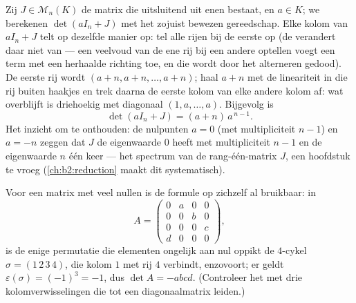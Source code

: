 \begin{example}\label{ex:b2:linalg:onesmatrix}
Zij $J \in \mathcal{M}_n(K)$ de matrix die uitsluitend uit enen
bestaat, en $a \in K$; we berekenen $\det(aI_n + J)$ met het zojuist
bewezen gereedschap. Elke kolom van $aI_n + J$ telt op dezelfde
manier op: tel alle rijen bij de eerste op (de 
verandert daar niet van --- een veelvoud van de ene rij bij een
andere optellen voegt een term met een herhaalde richting toe, en
die wordt door het alterneren gedood). De eerste rij wordt $(a +
n, a + n, \dots, a + n)$; haal $a + n$ met de lineariteit in die
rij buiten haakjes en trek daarna de eerste kolom van elke andere
kolom af: wat overblijft is driehoekig met diagonaal $(1, a,
\dots, a)$. Bijgevolg is
\[
\det(aI_n + J) = (a + n)\,a^{\,n-1}.
\]
Het inzicht om te onthouden: de nulpunten $a = 0$ (met
multipliciteit $n - 1$) en $a = -n$ zeggen dat $J$ de eigenwaarde
$0$ heeft met multipliciteit $n - 1$ en de eigenwaarde $n$ één
keer --- het spectrum van de rang-één-matrix $J$, een hoofdstuk te
vroeg (\cref{ch:b2:reduction} maakt dit systematisch).
\end{example}

\begin{example}\label{ex:b2:linalg:permexample}
Voor een matrix met veel nullen is de formule op zichzelf al
bruikbaar: in
\[
A = \begin{pmatrix}
0 & a & 0 & 0\\
0 & 0 & b & 0\\
0 & 0 & 0 & c\\
d & 0 & 0 & 0
\end{pmatrix},
\]
is de enige permutatie die elementen ongelijk aan nul oppikt de
$4$-cykel $\sigma = (1\,2\,3\,4)$, die kolom $1$ met rij $4$
verbindt, enzovoort; er geldt $\varepsilon(\sigma) = (-1)^3 = -1$,
dus $\det A = -abcd$. (Controleer het met drie kolomverwisselingen
die tot een diagonaalmatrix leiden.)
\end{example}

